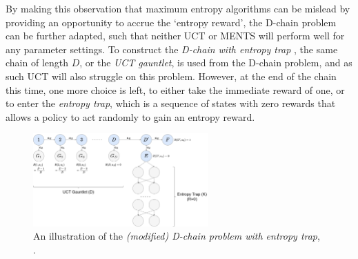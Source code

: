     By making this observation that maximum entropy algorithms can be mislead by providing an opportunity to accrue the `entropy reward', the D-chain problem can be further adapted, such that neither UCT or MENTS will perform well for any parameter settings. To construct the \textit{D-chain with entropy trap} , the same chain of length $D$, or the \textit{UCT gauntlet}, is used from the D-chain problem, and as such UCT will also struggle on this problem. However, at the end of the chain this time, one more choice is left, to either take the immediate reward of one, or to enter the \textit{entropy trap}, which is a sequence of states with zero rewards that allows a policy to act randomly to gain an entropy reward.
    \begin{figure}
        \centering
        \includegraphics[width=0.6\textwidth]{figures/temp/entropy_trap.png}
        \caption[An illustration of the \textit{(modified) D-chain problem with entropy trap}.]{An illustration of the \textit{(modified) D-chain problem with entropy trap}, . }
        \label{fig:d_chain_entropy_trap}
    \end{figure}



     

